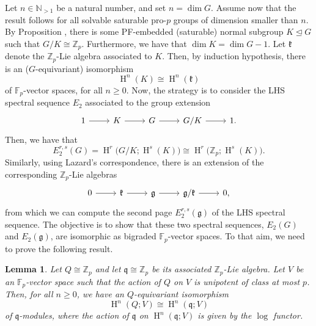 \documentclass[11pt]{article}
\newcommand{\N}{\mathbb{N}}
\newcommand{\Z}{\mathbb{Z}}
\newcommand{\F}{\mathbb{F}}
\newcommand{\Zp}{\mathbb{Z}_p}
\newcommand{\g}{\mathfrak{g}}
\newcommand{\kk}{\mathfrak{k}}
\newcommand{\q}{\mathfrak{q}}
\DeclareMathOperator{\HH}{H}
\newcommand{\isom}{\cong}
\newcommand{\normaleq}{\unlhd}
\theoremstyle{plain}
\newtheorem{lemma}{Lemma}[section]
\theoremstyle{definition}
\begin{document}
	Let $n\in \N_{>1}$ be a natural number, and set $n=\dim G$. Assume now that the result follows for all solvable saturable pro-$p$ groups of dimension smaller than $n$. 
	By Proposition , there is some PF-embedded (saturable) normal subgroup $K\normaleq G$ such that $G/K\isom \Zp$.  Furthermore, we have that $\dim K= \dim G -1$.  Let $\kk$ denote the $\Z_p$-Lie algebra associated to $K$. Then, by induction  hypothesis, there is an ($G$-equivariant) isomorphism $$\HH^n(K)\isom\HH^n(\kk)$$
	of $\F_p$-vector spaces, for all $n\geq 0$. Now, the strategy is to consider the LHS spectral sequence $E_2$ associated to the group extension
	\[\begin{tikzcd}
		1 \rar & K \rar & G \rar & G/K \rar &  1.
	\end{tikzcd}\]
	Then, we have that 
	\begin{displaymath}
		E_2^{r,s}(G)=\HH^r\big(G/K;\HH^s(K)\big)\isom \HH^r\big(\Z_p;\HH^s(K)\big).
	\end{displaymath}
	Similarly, using Lazard's correspondence, there is an extension of the corresponding $\Z_p$-Lie algebras
		\[\begin{tikzcd}
		0 \rar & \kk \rar & \g \rar & \g/\kk \rar &  0,
	\end{tikzcd}\]
	from which we can compute the second page $E_2^{r,s}(\g)$ of the LHS spectral sequence. The objective is to show that these two spectral sequences, $E_2(G)$ and $E_2(\g)$, are isomorphic as bigraded $\F_p$-vector spaces. To that aim, we need to prove the following result.

	
		\begin{lemma}\label{lem: abelian} Let $Q\cong \Z_p$ and let $\q\cong \Z_p$ be its associated $\Z_p$-Lie algebra. Let $V$ be an $\F_p$-vector space such that the action of $Q$ on $V$ is unipotent of class at most $p$. Then, for all $n\geq 0$, we have an $Q$-equivariant isomorphism 
		\begin{displaymath}
			\HH^n(Q;V) \isom \HH^n(\q; V)
		\end{displaymath}
		of  $\q$-modules, where the action of $\q$ on $\HH^n(\q; V)$ is given by the $\log$ functor.
	\end{lemma} 
	
\end{document}
